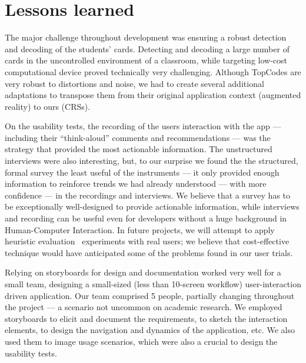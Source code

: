 \section{Lessons learned} \label{sec:lessons}

The major challenge throughout development was ensuring a robust detection and decoding of the students' cards. Detecting and decoding a large number of cards in the uncontrolled environment of a classroom, while targeting low-cost computational device proved technically very challenging. Although TopCodes are very robust to distortions and noise, we had to create several additional adaptations to transpose them from their original application context (augmented reality) to ours (CRSs).

On the usability tests, the recording of the users interaction with the app --- including their ``think-aloud'' comments and  recommendations --- was the strategy that provided the most actionable information. The unstructured interviews were also interesting, but, to our surprise we found the the structured, formal survey the least useful of the instruments --- it only provided enough information to reinforce trends we had already understood --- with more confidence --- in the recordings and interviews. We believe that a survey has to be exceptionally well-designed to provide actionable information, while interviews and recording can be useful even for developers without a huge background in Human-Computer Interaction. In future projects, we will attempt to apply heuristic evaluation~\cite{nielsen1990heuristic} experiments with real users; we believe that cost-effective technique would have anticipated some of the problems found in our user trials.

Relying on storyboards for design and documentation worked very well for a small team,  designing a small-sized (less than 10-screen workflow) user-interaction driven application. Our team comprised 5 people, partially changing throughout the project --- a scenario not uncommon on academic research. We employed storyboards to elicit and document the requirements, to sketch the interaction elements, to design the navigation and dynamics of the application, etc. We also used them to image usage scenarios, which were also a crucial to design the usability tests.

